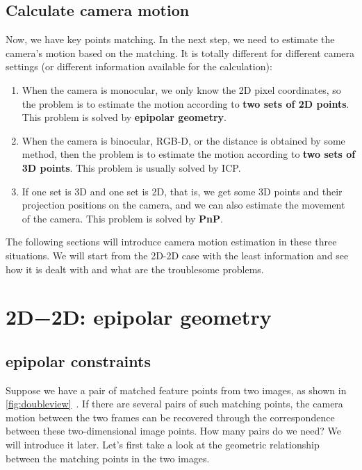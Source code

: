 \subsection{Calculate camera motion}
Now, we have key points matching. In the next step, we need to estimate the camera's motion based on the matching. It is totally different for different camera settings (or different information available for the calculation):

\begin{enumerate}
	\item When the camera is monocular, we only know the 2D pixel coordinates, so the problem is to estimate the motion according to \textbf{two sets of 2D points}. This problem is solved by \textbf{epipolar geometry}.
	\item When the camera is binocular, RGB-D, or the distance is obtained by some method, then the problem is to estimate the motion according to \textbf{two sets of 3D points}. This problem is usually solved by ICP.
	\item If one set is 3D and one set is 2D, that is, we get some 3D points and their projection positions on the camera, and we can also estimate the movement of the camera. This problem is solved by \textbf{PnP}.
\end{enumerate}

The following sections will introduce camera motion estimation in these three situations. We will start from the 2D-2D case with the least information and see how it is dealt with and what are the troublesome problems.

\section{2D−2D: epipolar geometry}
\label{sec:epipolar-geometry}

\subsection{epipolar constraints}

Suppose we have a pair of matched feature points from two images, as shown in \autoref{fig:doubleview}~. If there are several pairs of such matching points, the camera motion between the two frames can be recovered through the correspondence between these two-dimensional image points. How many pairs do we need? We will introduce it later. Let's first take a look at the geometric relationship between the matching points in the two images.

